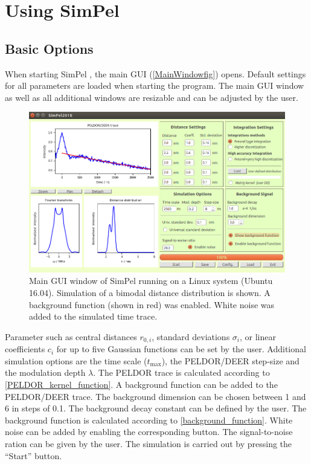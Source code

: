 \documentclass[pdftex,bezier,german,a4,twoside, headexclude,12pt,nochapterprefix, titlepage]{extarticle}
\newcommand{\simpel}{\textsf{SimPel} }
\begin{document}
\newpage
\section{Using \simpel}
\FloatBarrier
\subsection{Basic Options}
When starting \simpel, the main GUI (\autoref{MainWindowfig}) opens. Default settings for all parameters are loaded when starting
the program. The main GUI window as well as all additional windows are resizable and can be adjusted by the user.
\begin{figure}[h!]
\begin{center}
\includegraphics[scale=0.5]{Main_Window_example.png}
\caption{Main GUI window of \simpel running on a Linux system (Ubuntu 16.04). Simulation of a bimodal distance distribution is shown. A background
function (shown in red) was enabled. White noise was added to the simulated time trace.}
\label{MainWindowfig}
\end{center}
\end{figure}
Parameter such as central distances $r_{0,i}$, standard deviations $\sigma_i$, or linear coefficients $c_i$ for up to five
Gaussian functions can be set by the user. Additional simulation options are the time scale ($t_{\mathrm{max}}$), the 
PELDOR/DEER step-size and the modulation depth $\lambda$. The PELDOR trace is calculated according to  \autoref{PELDOR_kernel_function}.
A background function can be added to the PELDOR/DEER trace. The background dimension 
can be chosen between 1 and 6 in steps of 0.1. The background decay constant can be defined by the user. The background function is calculated according to \autoref{background_function}. White noise can be added by enabling the corresponding button. The signal-to-noise
ration can be given by the user.
The simulation is carried out by pressing the ``Start'' button. 
\end{document}
